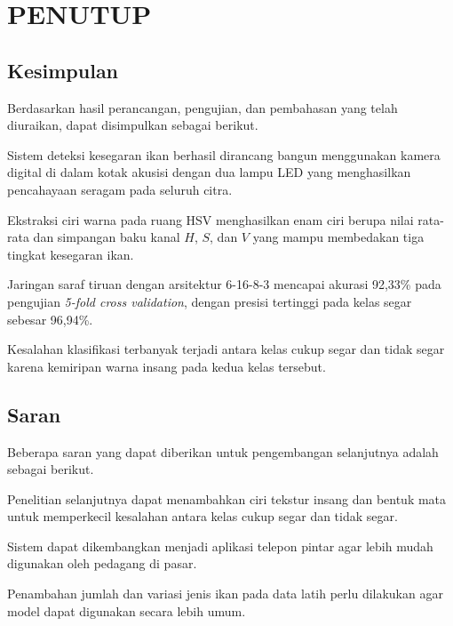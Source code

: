 \chapter{PENUTUP}
\label{chap:penutup}

\section{Kesimpulan}

Berdasarkan hasil perancangan, pengujian, dan pembahasan yang telah
diuraikan, dapat disimpulkan sebagai berikut.
\begin{packed_enum}
  \item Sistem deteksi kesegaran ikan berhasil dirancang bangun
        menggunakan kamera digital di dalam kotak akusisi dengan dua
        lampu LED yang menghasilkan pencahayaan seragam pada seluruh
        citra.
  \item Ekstraksi ciri warna pada ruang HSV menghasilkan enam ciri
        berupa nilai rata-rata dan simpangan baku kanal $H$, $S$, dan
        $V$ yang mampu membedakan tiga tingkat kesegaran ikan.
  \item Jaringan saraf tiruan dengan arsitektur 6-16-8-3 mencapai
        akurasi 92,33\% pada pengujian \textit{5-fold cross validation},
        dengan presisi tertinggi pada kelas segar sebesar 96,94\%.
  \item Kesalahan klasifikasi terbanyak terjadi antara kelas cukup
        segar dan tidak segar karena kemiripan warna insang pada kedua
        kelas tersebut.
\end{packed_enum}

\section{Saran}

Beberapa saran yang dapat diberikan untuk pengembangan selanjutnya
adalah sebagai berikut.
\begin{packed_enum}
  \item Penelitian selanjutnya dapat menambahkan ciri tekstur insang
        dan bentuk mata untuk memperkecil kesalahan antara kelas cukup
        segar dan tidak segar.
  \item Sistem dapat dikembangkan menjadi aplikasi telepon pintar agar
        lebih mudah digunakan oleh pedagang di pasar.
  \item Penambahan jumlah dan variasi jenis ikan pada data latih perlu
        dilakukan agar model dapat digunakan secara lebih umum.
\end{packed_enum}
